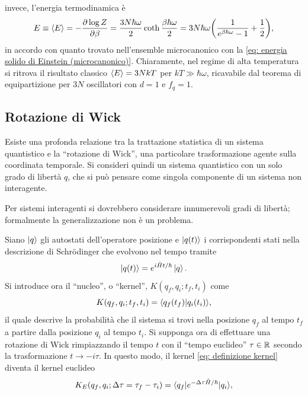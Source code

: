invece, l'energia termodinamica è
\begin{equation}
    E \equiv \langle E \rangle = -\frac{\partial\log{Z}}{\partial\beta} = \frac{3N\hbar\omega}{2}\coth{\frac{\beta\hbar\omega}{2}} = 3N\hbar\omega\bigg(\frac{1}{e^{\beta\hbar\omega} - 1} + \frac{1}{2}\bigg),
\end{equation}
in accordo con quanto trovato nell'ensemble microcanonico con la \eqref{eq: energia solido di Einstein (microcanonico)}. Chiaramente, nel regime di alta temperatura si ritrova il risultato classico $\langle E \rangle = 3NkT$ per $kT \gg \hbar\omega$, ricavabile dal teorema di equipartizione per $3N$ oscillatori con $d = 1$ e $f_q = 1$.

\subsection{Rotazione di Wick}
Esiste una profonda relazione tra la trattazione statistica di un sistema quantistico e la ``rotazione di Wick'', una particolare trasformazione agente sulla coordinata temporale. Si consideri quindi un sistema quantistico con un solo grado di libertà $q$, che si può pensare come singola componente di un sistema non interagente. 
\begin{obs}
    Per sistemi interagenti si dovrebbero considerare innumerevoli gradi di libertà; formalmente la generalizzazione non è un problema.
\end{obs}
Siano $\ket{q}$ gli autostati dell'operatore posizione e $\ket{q(t)}$ i corrispondenti stati nella descrizione di Schr\"odinger che evolvono nel tempo tramite
\begin{equation}
    \ket{q(t)} = e^{i\hat{H} t/\hbar}\ket{q}.
\end{equation}
Si introduce ora il ``nucleo'', o ``kernel'', $K(q_f,q_i;t_f,t_i)$ come
\begin{equation}
\label{eq: definizione kernel}
    K(q_f,q_i;t_f,t_i) = \langle q_f(t_f) | q_i(t_i) \rangle,
\end{equation}
il quale descrive la probabilità che il sistema si trovi nella posizione $q_f$ al tempo $t_f$ a partire dalla posizione $q_i$ al tempo $t_i$. Si supponga ora di effettuare una rotazione di Wick rimpiazzando il tempo $t$ con il ``tempo euclideo'' $\tau \in \mathbb{R}$ secondo la trasformazione $t \to -i\tau$. In questo modo, il kernel \eqref{eq: definizione kernel} diventa il kernel euclideo
\begin{equation}
    K_E(q_f,q_i;\Delta\tau = \tau_f - \tau_i) = \langle q_f | e^{-\Delta\tau\hat{H}/\hbar} | q_i \rangle,
\end{equation}
